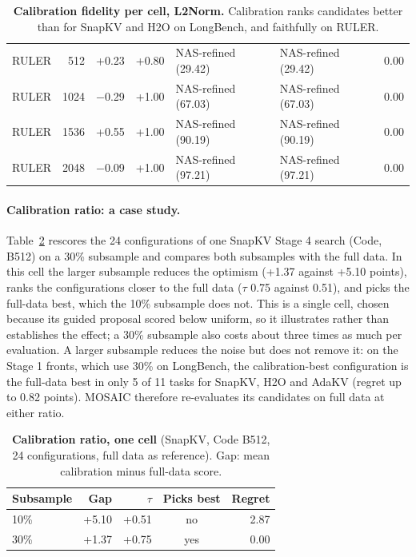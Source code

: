\begin{table}[t]
\begin{tabular}{@{}l r r r l l r@{}}
    RULER & 512 & +0.23 & +0.80 & NAS-refined (29.42) & NAS-refined (29.42) & 0.00 \\
    RULER & 1024 & $-$0.29 & +1.00 & NAS-refined (67.03) & NAS-refined (67.03) & 0.00 \\
    RULER & 1536 & +0.55 & +1.00 & NAS-refined (90.19) & NAS-refined (90.19) & 0.00 \\
    RULER & 2048 & $-$0.09 & +1.00 & NAS-refined (97.21) & NAS-refined (97.21) & 0.00 \\
    \bottomrule
  \end{tabular}
  \caption{\textbf{Calibration fidelity per cell, L2Norm.} Calibration ranks candidates better than for SnapKV and H2O on LongBench, and faithfully on RULER.}
  \label{tab:app-calib-l2norm}
\end{table}


\paragraph{Calibration ratio: a case study.} Table~\ref{tab:app-calib-ratio} rescores the 24 configurations of one SnapKV Stage 4 search (Code, B512) on a 30\% subsample and compares both subsamples with the full data. In this cell the larger subsample reduces the optimism (+1.37 against +5.10 points), ranks the configurations closer to the full data ($\tau$ 0.75 against 0.51), and picks the full-data best, which the 10\% subsample does not. This is a single cell, chosen because its guided proposal scored below uniform, so it illustrates rather than establishes the effect; a 30\% subsample also costs about three times as much per evaluation. A larger subsample reduces the noise but does not remove it: on the Stage 1 fronts, which use 30\% on LongBench, the calibration-best configuration is the full-data best in only 5 of 11 tasks for SnapKV, H2O and AdaKV (regret up to 0.82 points). MOSAIC therefore re-evaluates its candidates on full data at either ratio.

\begin{table}[!htbp]
  \centering
  \footnotesize
  \setlength{\tabcolsep}{4pt}
  \begin{tabular}{@{}l r r c r@{}}
    \toprule
    Subsample & Gap & $\tau$ & Picks best & Regret \\
    \midrule
    10\% & +5.10 & +0.51 & no & 2.87 \\
    30\% & +1.37 & +0.75 & yes & 0.00 \\
    \bottomrule
  \end{tabular}
  \caption{\textbf{Calibration ratio, one cell} (SnapKV, Code B512, 24 configurations, full data as reference). Gap: mean calibration minus full-data score.}
  \label{tab:app-calib-ratio}
\end{table}


